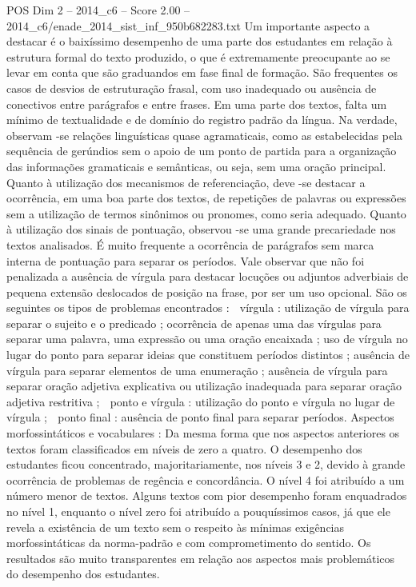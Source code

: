 \begin{textsample}{POS Dim 2 – 2014\_c6 – Score 2.00 – 2014\_c6/enade\_2014\_sist\_inf\_950b682283.txt}
Um importante aspecto a destacar é o baixíssimo desempenho de uma parte dos estudantes em relação à estrutura formal do texto produzido, o que é extremamente preocupante ao se levar em conta que são graduandos em fase final de formação.
São frequentes os casos de desvios de estruturação frasal, com uso inadequado ou ausência de conectivos entre parágrafos e entre frases.
Em uma parte dos textos, falta um mínimo de textualidade e de domínio do registro padrão da língua.
Na verdade, observam -se relações linguísticas quase agramaticais, como as estabelecidas pela sequência de gerúndios sem o apoio de um ponto de partida para a organização das informações gramaticais e semânticas, ou seja, sem uma oração principal.
Quanto à utilização dos mecanismos de referenciação, deve -se destacar a ocorrência, em uma boa parte dos textos, de repetições de palavras ou expressões sem a utilização de termos sinônimos ou pronomes, como seria adequado.
Quanto à utilização dos sinais de pontuação, observou -se uma grande precariedade nos textos analisados.
É muito frequente a ocorrência de parágrafos sem marca interna de pontuação para separar os períodos.
Vale observar que não foi penalizada a ausência de vírgula para destacar locuções ou adjuntos adverbiais de pequena extensão deslocados de posição na frase, por ser um uso opcional.
São os seguintes os tipos de problemas encontrados :  vírgula : utilização de vírgula para separar o sujeito e o predicado ; ocorrência de apenas uma das vírgulas para separar uma palavra, uma expressão ou uma oração encaixada ; uso de vírgula no lugar do ponto para separar ideias que constituem períodos distintos ; ausência de vírgula para separar elementos de uma enumeração ; ausência de vírgula para separar oração adjetiva explicativa ou utilização inadequada para separar oração adjetiva restritiva ;  ponto e vírgula : utilização do ponto e vírgula no lugar de vírgula ;  ponto final : ausência de ponto final para separar períodos.
Aspectos morfossintáticos e vocabulares : Da mesma forma que nos aspectos anteriores os textos foram classificados em níveis de zero a quatro.
O desempenho dos estudantes ficou concentrado, majoritariamente, nos níveis 3 e 2, devido à grande ocorrência de problemas de regência e concordância.
O nível 4 foi atribuído a um número menor de textos.
Alguns textos com pior desempenho foram enquadrados no nível 1, enquanto o nível zero foi atribuído a pouquíssimos casos, já que ele revela a existência de um texto sem o respeito às mínimas exigências morfossintáticas da norma-padrão e com comprometimento do sentido.
Os resultados são muito transparentes em relação aos aspectos mais problemáticos do desempenho dos estudantes.

\end{textsample}
